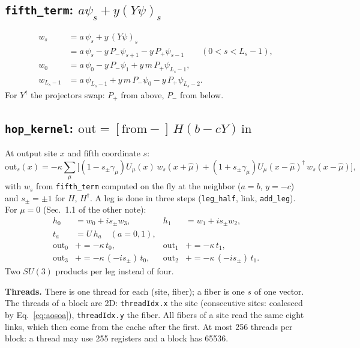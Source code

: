 \documentclass[11pt,a4paper]{article}
\numberwithin{equation}{section}
\newcommand{\code}[1]{\texttt{\small #1}}
\newcommand{\dg}{^{\dagger}}
\begin{document}
\subsection{\code{fifth\_term}: $a\psi_s + y(Y\psi)_s$}

\begin{align}
w_s &= a\,\psi_s + y\,(Y\psi)_s\\
&= a\,\psi_s - y\,P_-\psi_{s+1} - y\,P_+\psi_{s-1}\qquad (0<s<L_s-1),\\
w_0 &= a\,\psi_0 - y\,P_-\psi_1 + y\,m\,P_+\psi_{L_s-1},\\
w_{L_s-1} &= a\,\psi_{L_s-1} + y\,m\,P_-\psi_0 - y\,P_+\psi_{L_s-2}.
\end{align}
For $Y\dg$ the projectors swap: $P_+$ from above, $P_-$ from below.

\subsection{\code{hop\_kernel}: $\text{out} = [\text{from}-]\,H(b-cY)\,\text{in}$}

At output site $x$ and fifth coordinate $s$:
\begin{equation}
\text{out}_s(x) = -\kappa\sum_\mu\Big[(1-s_\pm\gamma_\mu)U_\mu(x)\,w_s(x+\hat\mu) + (1+s_\pm\gamma_\mu)U_\mu(x-\hat\mu)\dg\,w_s(x-\hat\mu)\Big],
\end{equation}
with $w_s$ from \code{fifth\_term} computed on the fly at the neighbor ($a=b$, $y=-c$) and
$s_\pm=\pm1$ for $H$, $H\dg$. A leg is done in three steps (\code{leg\_half}, link,
\code{add\_leg}). For $\mu=0$ (Sec.~1.1 of the other note):
\begin{align}
h_0 &= w_0 + is_\pm w_3, & h_1 &= w_1 + is_\pm w_2,\\
t_a &= U\,h_a\quad(a=0,1), \\
\text{out}_0 &\mathrel{+}= -\kappa\,t_0, & \text{out}_1 &\mathrel{+}= -\kappa\,t_1,\\
\text{out}_3 &\mathrel{+}= -\kappa\,(-is_\pm)\,t_0, & \text{out}_2 &\mathrel{+}= -\kappa\,(-is_\pm)\,t_1 .
\end{align}
Two $SU(3)$ products per leg instead of four.

\textbf{Threads.} There is one thread for each (site, fiber); a fiber is one $s$ of one vector. The
threads of a block are 2D: \code{threadIdx.x} the site (consecutive sites: coalesced by
Eq.~\eqref{eq:aosoa}), \code{threadIdx.y} the fiber. All fibers of a site read the same eight
links, which then come from the cache after the first. At most 256 threads per block: a thread may
use 255 registers and a block has 65536.
\end{document}
